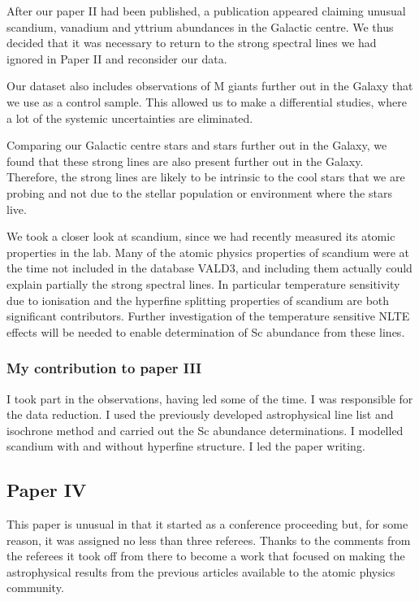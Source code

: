 After our paper II had been published, a publication \citep{do:18} appeared claiming unusual scandium, vanadium and yttrium abundances in the Galactic centre. We thus decided that it was necessary to return to the strong spectral lines we had ignored in Paper II and reconsider our data.

Our dataset also includes observations of M giants further out in the Galaxy that we use as a control sample. This allowed us to make a differential studies, where a lot of the systemic uncertainties are eliminated.

Comparing our Galactic centre stars and stars further out in the Galaxy, we found that these strong lines are also present further out in the Galaxy. Therefore, the strong lines are likely to be intrinsic to the cool stars that we are probing and not due to the stellar population or environment where the stars live.

We took a closer look at scandium, since we had recently measured its atomic properties in the lab. Many of the atomic physics properties of scandium were at the time not included in the database VALD3, and including them actually could explain partially the strong spectral lines. In particular temperature sensitivity due to ionisation and the hyperfine splitting properties of scandium are both significant contributors. Further investigation of the temperature sensitive NLTE effects will be needed to enable determination of Sc abundance from these lines.

\subsubsection*{My contribution to paper III}

I took part in the observations, having led some of the time. I was responsible for the data reduction. I used the previously developed astrophysical line list and isochrone method and carried out the Sc abundance determinations. I modelled scandium with and without hyperfine structure. I led the paper writing.


\subsection*{Paper IV}

This paper is unusual in that it started as a conference proceeding but, for some reason, it was assigned no less than three referees. Thanks to the comments from the referees it took off from there to become a work that focused on making the astrophysical results from the previous articles available to the atomic physics community.

